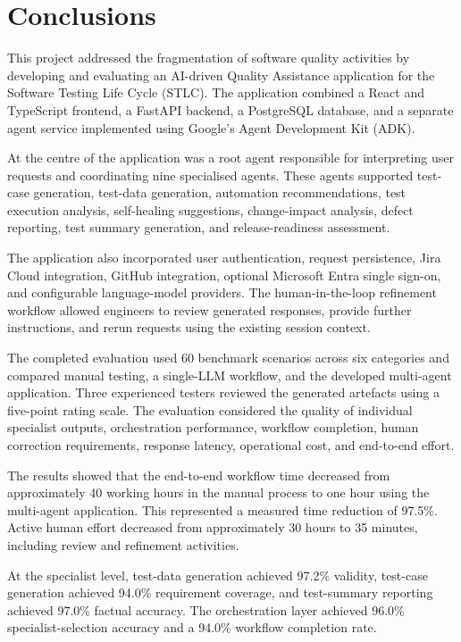 \chapter{Conclusions}
\label{chap:conclusion}

This project addressed the fragmentation of software quality activities by developing and evaluating an AI-driven Quality Assistance application for the Software Testing Life Cycle (STLC). The application combined a React and TypeScript frontend, a FastAPI backend, a PostgreSQL database, and a separate agent service implemented using Google’s Agent Development Kit (ADK).

At the centre of the application was a root agent responsible for interpreting user requests and coordinating nine specialised agents. These agents supported test-case generation, test-data generation, automation recommendations, test execution analysis, self-healing suggestions, change-impact analysis, defect reporting, test summary generation, and release-readiness assessment.

The application also incorporated user authentication, request persistence, Jira Cloud integration, GitHub integration, optional Microsoft Entra single sign-on, and configurable language-model providers. The human-in-the-loop refinement workflow allowed engineers to review generated responses, provide further instructions, and rerun requests using the existing session context.

The completed evaluation used 60 benchmark scenarios across six categories and compared manual testing, a single-LLM workflow, and the developed multi-agent application. Three experienced testers reviewed the generated artefacts using a five-point rating scale. The evaluation considered the quality of individual specialist outputs, orchestration performance, workflow completion, human correction requirements, response latency, operational cost, and end-to-end effort.

The results showed that the end-to-end workflow time decreased from approximately 40 working hours in the manual process to one hour using the multi-agent application. This represented a measured time reduction of 97.5\%. Active human effort decreased from approximately 30 hours to 35 minutes, including review and refinement activities.

At the specialist level, test-data generation achieved 97.2\% validity, test-case generation achieved 94.0\% requirement coverage, and test-summary reporting achieved 97.0\% factual accuracy. The orchestration layer achieved 96.0\% specialist-selection accuracy and a 94.0\% workflow completion rate.

